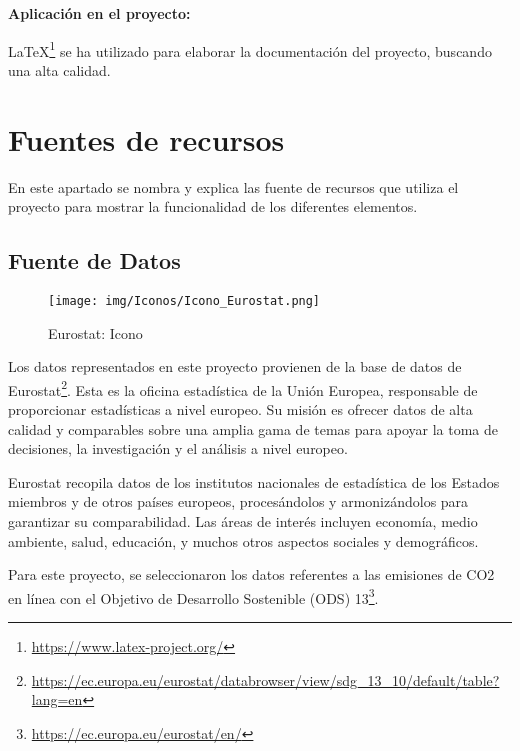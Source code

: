\documentclass[a4paper, 12pt]{book}
\begin{document}
        \vspace{0.5cm} %
        \textbf{Aplicación en el proyecto:} 
        
        LaTeX\footnote{\url{https://www.latex-project.org/}} se ha utilizado para elaborar la documentación del proyecto, buscando una alta calidad.
    
    
    







    


\section{Fuentes de recursos} 
\label{sec:Recursos}
En este apartado se nombra y explica las fuente de recursos que utiliza el proyecto para mostrar la funcionalidad de los diferentes elementos.

    \subsection{Fuente de Datos} 
        \begin{figure}[H]
            \centering
            \texttt{[image: img/Iconos/Icono\_Eurostat.png]}
            \caption{Eurostat: Icono}
            \label{fig:enter-label}
         \end{figure}
    
    Los datos representados en este proyecto provienen de la base de datos de Eurostat\footnote{\url{https://ec.europa.eu/eurostat/databrowser/view/sdg_13_10/default/table?lang=en}}. Esta es la oficina estadística de la Unión Europea, responsable de proporcionar estadísticas a nivel europeo. Su misión es ofrecer datos de alta calidad y comparables sobre una amplia gama de temas para apoyar la toma de decisiones, la investigación y el análisis a nivel europeo.
    
    Eurostat recopila datos de los institutos nacionales de estadística de los Estados miembros y de otros países europeos, procesándolos y armonizándolos para garantizar su comparabilidad. Las áreas de interés incluyen economía, medio ambiente, salud, educación, y muchos otros aspectos sociales y demográficos.
    
    Para este proyecto, se seleccionaron los datos referentes a las emisiones de CO2 en línea con el Objetivo de Desarrollo Sostenible (ODS) 13\footnote{\url{https://ec.europa.eu/eurostat/en/}}.
    
\end{document}

